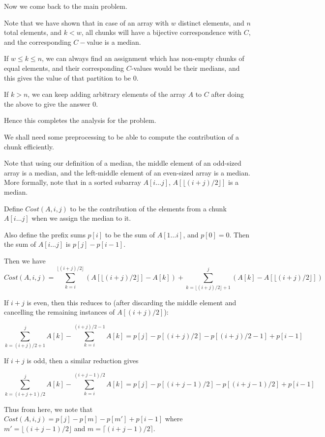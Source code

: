 Now we come back to the main problem. 

Note that we have shown that in case of an array with $w$ distinct elements, and $n$ total elements, and $k < w$, all chunks will have a bijective correspondence with $C$, and the
corresponding $C-$value is a median.

If $w \le k \le n$, we can always find an assignment which has non-empty chunks of equal elements, and their corresponding $C$-values would be their medians, and this gives the value of that partition to be $0$.

If $k > n$, we can keep adding arbitrary elements of the array $A$ to $C$ after doing the above to give the answer $0$.

Hence this completes the analysis for the problem.

We shall need some preprocessing to be able to compute the contribution of a chunk efficiently.

Note that using our definition of a median, the middle element of an odd-sized array is a median, and the left-middle element of an even-sized array is a median. More formally, note that in a
sorted subarray $A[i\ldots j]$, $A[\lfloor(i + j) / 2\rfloor]$ is a median.

Define $Cost(A, i, j)$ to be the contribution of the elements from a chunk $A[i\ldots j]$ when we assign the median to it.

Also define the prefix sums $p[i]$ to be the sum of $A[1\ldots i]$, and $p[0] = 0$. Then the sum of $A[i\ldots j]$ is $p[j] - p[i - 1]$.

Then we have 
$$Cost(A, i, j) = \sum_{k = i}^{\lfloor(i + j)/2\rfloor} (A[\lfloor(i + j) / 2\rfloor] - A[k]) + \sum_{k = \lfloor(i + j)/2\rfloor + 1}^{j} (A[k] - A[\lfloor(i + j)/2\rfloor])$$

If $i + j$ is even, then this reduces to (after discarding the middle element and cancelling the remaining instances of $A[(i + j)/2]$):

$$\sum_{k = (i + j)/2 + 1}^j A[k] - \sum_{k = i}^{(i + j) / 2 - 1} A[k] = p[j] - p[(i + j) / 2] - p[(i + j) / 2 - 1] + p[i - 1]$$

If $i + j$ is odd, then a similar reduction gives 

$$\sum_{k = (i + j + 1)/2}^j A[k] - \sum_{k = i}^{(i + j - 1) / 2} A[k] = p[j] - p[(i + j - 1) / 2] - p[(i + j - 1) / 2] + p[i - 1]$$

Thus from here, we note that $Cost(A, i, j) = p[j] - p[m] - p[m'] + p[i - 1]$ where $m' = \lfloor(i + j - 1)/2\rfloor$ and $m = \lceil(i + j - 1)/2\rceil$.

